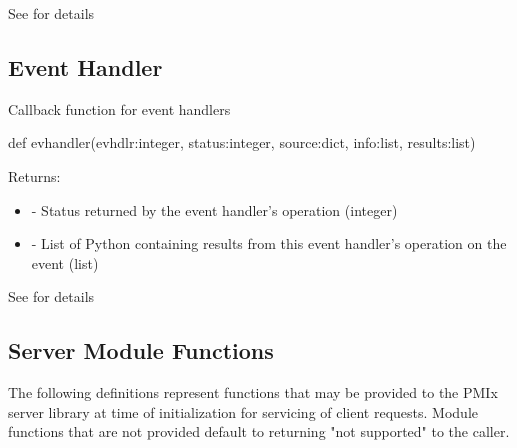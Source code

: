 See  for details


\subsection{Event Handler}

\summary

Callback function for event handlers

\format

\pyspecificstart
\begin{codepar}
def evhandler(evhdlr:integer, status:integer,
              source:dict, info:list, results:list)
\end{codepar}
\pyspecificend

\begin{arglist}
\end{arglist}

Returns:
\begin{itemize}
    \item {} - Status returned by the event handler's operation (integer)
    \item {} - List of Python  containing results from this event handler's operation on the event (list)
\end{itemize}

See  for details


\subsection{Server Module Functions}

The following definitions represent functions that may be provided to the \ac{PMIx} server library at time of initialization for servicing of client requests. Module functions that are not provided default to returning "not supported" to the caller.


